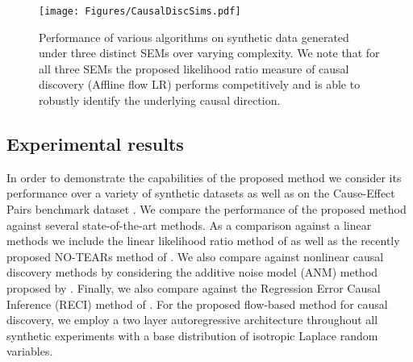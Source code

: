 \documentclass{article}
\begin{document}
\begin{figure*}[ht]
	\vskip 0.2in
	\begin{center}
		\centerline{\texttt{[image: Figures/CausalDiscSims.pdf]}}%
		\caption{Performance of various algorithms on synthetic data generated under three
			distinct SEMs over varying complexity. We note that for all three SEMs the proposed likelihood ratio measure of causal discovery
			(Affline flow LR) performs competitively and is able to robustly identify the underlying causal direction. }
		\label{Fig:causalDiscSimulations}
	\end{center}
	\vskip -0.2in
\end{figure*}

\subsection{Experimental results}

In order to demonstrate the capabilities of the proposed method we consider its performance over a variety of synthetic 
datasets as well as on the Cause-Effect Pairs benchmark dataset \citep{mooij2016distinguishing}. 
We compare the performance of the proposed method against several state-of-the-art methods. 
As a comparison against a linear methods we include the 
linear likelihood ratio method of \cite{Hyvarinen2013} as well as the recently
proposed NO-TEARs method of \cite{zheng2018dags}.
We also compare against nonlinear causal discovery methods by considering 
%
the additive noise model (ANM) method 
proposed by \cite{Hoyer2009, Peters2013}. 
Finally, we also
compare against the Regression Error Causal Inference (RECI) method of 
\cite{Blobaum2018}. 
For the proposed flow-based method for causal discovery, we 
employ a two layer autoregressive architecture throughout all synthetic experiments
with a base distribution of isotropic Laplace random variables. 



\end{document}
